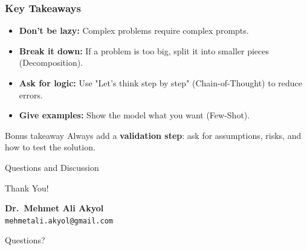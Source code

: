 \documentclass{beamer}
\begin{document}
\begin{frame}
    \frametitle{Key Takeaways}
    \begin{itemize}
        \item \textbf{Don't be lazy:} Complex problems require complex prompts.
        \item \textbf{Break it down:} If a problem is too big, split it into smaller pieces (Decomposition).
        \item \textbf{Ask for logic:} Use "Let's think step by step" (Chain-of-Thought) to reduce errors.
        \item \textbf{Give examples:} Show the model what you want (Few-Shot).
    \end{itemize}
    \begin{block}{Bonus takeaway}
        Always add a \textbf{validation step}: ask for assumptions, risks, and how to test the solution.
    \end{block}
\end{frame}

\begin{frame}{Questions and Discussion}
    \begin{center}
    {\Huge Thank You!}
    \vspace{1cm}

        \textbf{Dr.\ Mehmet Ali Akyol}\\
        \texttt{mehmetali.akyol@gmail.com}
    \vspace{1cm}

    {\large Questions?}
    \end{center}
\end{frame}
\end{document}
